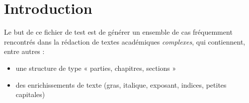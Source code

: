 \documentclass{panIFSI}
\begin{document}
\maketitle
\nocite{*}
\section{Introduction}\label{introduction}

Le but de ce fichier de test est de générer un ensemble de cas
fréquemment rencontrés dans la rédaction de textes académiques
\emph{complexes}, qui contiennent, entre autres :

\begin{itemize}
\tightlist
\item
  une structure de type « parties, chapitres, sections »
\item
  des enrichissements de texte (gras, italique, exposant, indices,
  petites capitales)
\end{itemize}

\printbibliography
\end{document}
